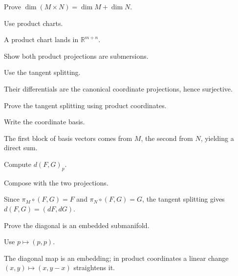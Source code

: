 \begin{exercise}\label{exr:vii06-15}
Prove \(\dim(M\times N)=\dim M+\dim N\).
\end{exercise}
\begin{hint}
Use product charts.
\end{hint}
\begin{solution}
A product chart lands in \(\mathbb R^{m+n}\).
\end{solution}

\begin{exercise}\label{exr:vii06-16}
Show both product projections are submersions.
\end{exercise}
\begin{hint}
Use the tangent splitting.
\end{hint}
\begin{solution}
Their differentials are the canonical coordinate projections, hence surjective.
\end{solution}

\begin{exercise}\label{exr:vii06-17}
Prove the tangent splitting using product coordinates.
\end{exercise}
\begin{hint}
Write the coordinate basis.
\end{hint}
\begin{solution}
The first block of basis vectors comes from \(M\), the second from \(N\), yielding a direct sum.
\end{solution}

\begin{exercise}\label{exr:vii06-18}
Compute \(d(F,G)_p\).
\end{exercise}
\begin{hint}
Compose with the two projections.
\end{hint}
\begin{solution}
Since \(\pi_M\circ(F,G)=F\) and \(\pi_N\circ(F,G)=G\), the tangent splitting gives \(d(F,G)=(dF,dG)\).
\end{solution}

\begin{exercise}\label{exr:vii06-19}
Prove the diagonal is an embedded submanifold.
\end{exercise}
\begin{hint}
Use \(p\mapsto(p,p)\).
\end{hint}
\begin{solution}
The diagonal map is an embedding; in product coordinates a linear change \((x,y)\mapsto(x,y-x)\) straightens it.
\end{solution}

